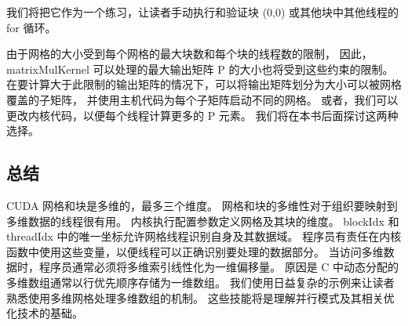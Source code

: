 我们将把它作为一个练习，让读者手动执行和验证块 (0,0) 或其他块中其他线程的 for 循环。

由于网格的大小受到每个网格的最大块数和每个块的线程数的限制，
因此，matrixMulKernel 可以处理的最大输出矩阵 P 的大小也将受到这些约束的限制。 
在要计算大于此限制的输出矩阵的情况下，可以将输出矩阵划分为大小可以被网格覆盖的子矩阵，
并使用主机代码为每个子矩阵启动不同的网格。 或者，我们可以更改内核代码，以便每个线程计算更多的 P 元素。 
我们将在本书后面探讨这两种选择。

\subsection{总结}
CUDA 网格和块是多维的，最多三个维度。 网格和块的多维性对于组织要映射到多维数据的线程很有用。 
内核执行配置参数定义网格及其块的维度。 blockIdx 和 threadIdx 中的唯一坐标允许网格线程识别自身及其数据域。 
程序员有责任在内核函数中使用这些变量，以便线程可以正确识别要处理的数据部分。 
当访问多维数据时，程序员通常必须将多维索引线性化为一维偏移量。 
原因是 C 中动态分配的多维数组通常以行优先顺序存储为一维数组。 
我们使用日益复杂的示例来让读者熟悉使用多维网格处理多维数组的机制。 这些技能将是理解并行模式及其相关优化技术的基础。